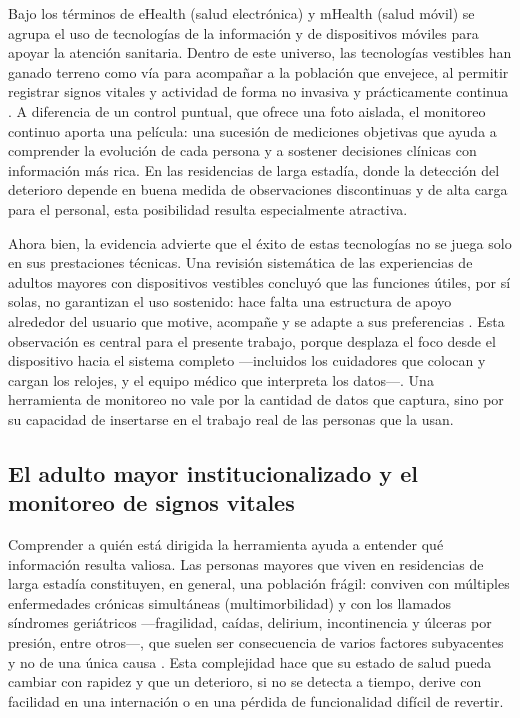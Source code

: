 \documentclass[12pt,a4paper]{article}
\begin{document}
    Bajo los términos de eHealth (salud electrónica) y mHealth (salud móvil) se agrupa el uso de tecnologías de la información y de dispositivos móviles para apoyar la atención sanitaria. Dentro de este universo, las tecnologías vestibles han ganado terreno como vía para acompañar a la población que envejece, al permitir registrar signos vitales y actividad de forma no invasiva y prácticamente continua \cite{malwade2018}. A diferencia de un control puntual, que ofrece una foto aislada, el monitoreo continuo aporta una película: una sucesión de mediciones objetivas que ayuda a comprender la evolución de cada persona y a sostener decisiones clínicas con información más rica. En las residencias de larga estadía, donde la detección del deterioro depende en buena medida de observaciones discontinuas y de alta carga para el personal, esta posibilidad resulta especialmente atractiva.

    Ahora bien, la evidencia advierte que el éxito de estas tecnologías no se juega solo en sus prestaciones técnicas. Una revisión sistemática de las experiencias de adultos mayores con dispositivos vestibles concluyó que las funciones útiles, por sí solas, no garantizan el uso sostenido: hace falta una estructura de apoyo alrededor del usuario que motive, acompañe y se adapte a sus preferencias \cite{moore2021}. Esta observación es central para el presente trabajo, porque desplaza el foco desde el dispositivo hacia el sistema completo —incluidos los cuidadores que colocan y cargan los relojes, y el equipo médico que interpreta los datos—. Una herramienta de monitoreo no vale por la cantidad de datos que captura, sino por su capacidad de insertarse en el trabajo real de las personas que la usan.

    \subsection{El adulto mayor institucionalizado y el monitoreo de signos vitales}
    Comprender a quién está dirigida la herramienta ayuda a entender qué información resulta valiosa. Las personas mayores que viven en residencias de larga estadía constituyen, en general, una población frágil: conviven con múltiples enfermedades crónicas simultáneas (multimorbilidad) y con los llamados síndromes geriátricos —fragilidad, caídas, delirium, incontinencia y úlceras por presión, entre otros—, que suelen ser consecuencia de varios factores subyacentes y no de una única causa \cite{who_ageing}. Esta complejidad hace que su estado de salud pueda cambiar con rapidez y que un deterioro, si no se detecta a tiempo, derive con facilidad en una internación o en una pérdida de funcionalidad difícil de revertir.
\end{document}
